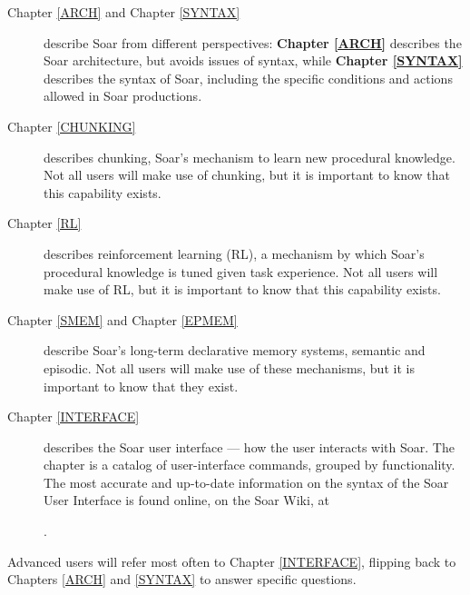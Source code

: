 \begin{description}
\item[Chapter \ref{ARCH} and Chapter \ref{SYNTAX}] describe Soar from
different perspectives: \textbf{Chapter \ref{ARCH}} describes the Soar
architecture, but avoids issues of syntax, while \textbf{Chapter \ref{SYNTAX}}
describes the syntax of Soar, including the specific conditions and actions
allowed in Soar productions.

\item[Chapter \ref{CHUNKING}] describes chunking, Soar's
mechanism to learn new procedural knowledge.  Not all users will make use of 
chunking, but it is important to know that this capability exists.

\item[Chapter \ref{RL}] describes reinforcement learning (RL), a mechanism
by which Soar's procedural knowledge is tuned given task experience.
Not all users will make use of RL, but it is important to know that this capability exists.

\item[Chapter \ref{SMEM} and Chapter \ref{EPMEM}] describe Soar's long-term declarative
memory systems, semantic and episodic. Not all users will make use of these mechanisms, 
but it is important to know that they exist.

\item[Chapter \ref{INTERFACE}] describes the Soar user interface --- how the
user interacts with Soar. The chapter is a catalog of user-interface commands,
grouped by functionality.  The most accurate and up-to-date information on the syntax of the Soar User Interface is found online, on the Soar Wiki, at

\hspace{2em}.

\end{description}

Advanced users will refer most often to Chapter \ref{INTERFACE}, flipping back
to Chapters \ref{ARCH} and \ref{SYNTAX} to answer specific questions.

